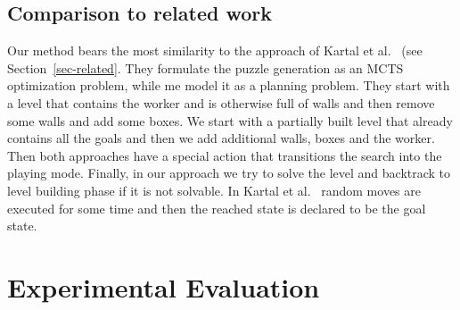 \documentclass[runningheads]{llncs}
\begin{document}
\subsection{Comparison to related work}
Our method bears the most similarity to the approach of Kartal et al.~\cite{kartal2016data} (see Section~\ref{sec-related}. They formulate the puzzle generation as an MCTS optimization problem, while me model it as a planning
problem. They start with a level that contains the worker and is otherwise full of walls and then remove some 
walls and add some boxes. We start with
a partially built level that already contains all the goals and then we add additional walls, boxes and the worker.
Then both approaches have a special action that transitions the search into the playing mode.
Finally, in our approach we try to solve the level and backtrack to level building phase if it is not solvable.
In Kartal et al.~\cite{kartal2016data} random moves are executed for some time and then the reached state is
declared to be the goal state.

\section{Experimental Evaluation}
\renewcommand{\sokoimg}[1]{\texttt{[image: \#1]} \hspace{-0.35em}}
\end{document}
